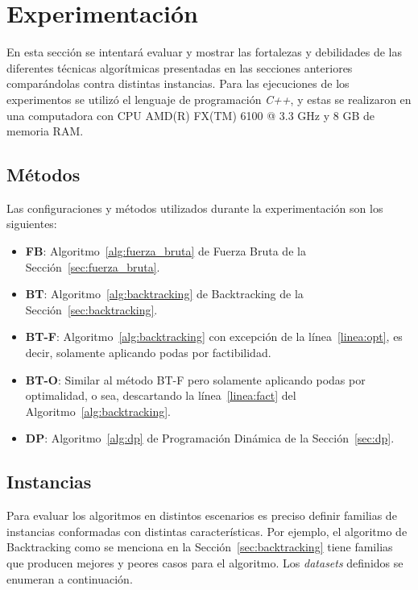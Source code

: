 \documentclass{article}
\begin{document}
\section{Experimentación} \label{sec:experimentacion}
En esta sección se intentará evaluar y mostrar las fortalezas y debilidades de las diferentes técnicas algorítmicas presentadas en las secciones anteriores comparándolas contra distintas instancias. Para las ejecuciones de los experimentos se utilizó el lenguaje de programación \emph{C++}, y estas se realizaron en una computadora con CPU AMD(R) FX(TM) 6100 @ 3.3 GHz
y 8 GB de memoria RAM.

\subsection{Métodos}
Las configuraciones y métodos utilizados durante la experimentación son los siguientes:
\begin{itemize}
    \setlength{\itemsep}{1pt}
    \setlength{\parskip}{0pt}
    \setlength{\parsep}{0pt}
    \item \textbf{FB}: Algoritmo~\ref{alg:fuerza_bruta} de Fuerza Bruta de la Sección~\ref{sec:fuerza_bruta}.
    \item \textbf{BT}: Algoritmo~\ref{alg:backtracking} de Backtracking de la Sección~\ref{sec:backtracking}.
    \item \textbf{BT-F}: Algoritmo~\ref{alg:backtracking} con excepción de la línea~\ref{linea:opt}, es decir, solamente aplicando podas por factibilidad.
    \item \textbf{BT-O}: Similar al método BT-F pero solamente aplicando podas por optimalidad, o sea, descartando la línea~\ref{linea:fact} del Algoritmo~\ref{alg:backtracking}.
    \item \textbf{DP}: Algoritmo~\ref{alg:dp} de Programación Dinámica de la Sección~\ref{sec:dp}.
\end{itemize}

\subsection{Instancias}
Para evaluar los algoritmos en distintos escenarios es preciso definir familias de instancias conformadas con distintas características. Por ejemplo, el algoritmo de Backtracking como se menciona en la Sección~\ref{sec:backtracking} tiene familias que producen mejores y peores casos para el algoritmo. Los \emph{datasets} definidos se enumeran a continuación.
\end{document}
